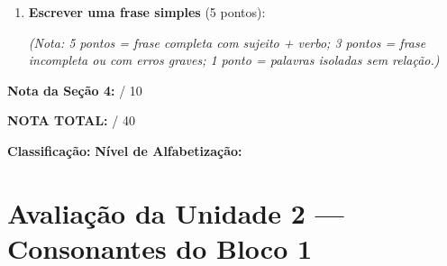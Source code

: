 \begin{avaliacao}
\begin{enumerate}[resume]
  \item \textbf{Escrever uma frase simples} (5 pontos):
  \begin{center}
  \underline{\hspace{10cm}}
  \end{center}
  \textit{(Nota: 5 pontos = frase completa com sujeito + verbo;
  3 pontos = frase incompleta ou com erros graves;
  1 ponto = palavras isoladas sem relação.)}
\end{enumerate}

\medskip
\noindent\textbf{Nota da Seção 4:} \underline{\hspace{1cm}} / 10

\begin{center}
\large\textbf{NOTA TOTAL:} \underline{\hspace{1.5cm}} / 40
\end{center}

\begin{center}
\textbf{Classificação:} \underline{\hspace{3cm}}
\hspace{1cm}
\textbf{Nível de Alfabetização:} \underline{\hspace{3cm}}
\end{center}

\end{avaliacao}


\section{Avaliação da Unidade 2 --- Consonantes do Bloco 1}

